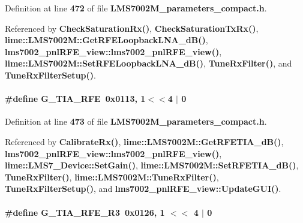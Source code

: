 Definition at line {\bf 472} of file {\bf L\+M\+S7002\+M\+\_\+parameters\+\_\+compact.\+h}.



Referenced by {\bf Check\+Saturation\+Rx()}, {\bf Check\+Saturation\+Tx\+Rx()}, {\bf lime\+::\+L\+M\+S7002\+M\+::\+Get\+R\+F\+E\+Loopback\+L\+N\+A\+\_\+d\+B()}, {\bf lms7002\+\_\+pnl\+R\+F\+E\+\_\+view\+::lms7002\+\_\+pnl\+R\+F\+E\+\_\+view()}, {\bf lime\+::\+L\+M\+S7002\+M\+::\+Set\+R\+F\+E\+Loopback\+L\+N\+A\+\_\+d\+B()}, {\bf Tune\+Rx\+Filter()}, and {\bf Tune\+Rx\+Filter\+Setup()}.

\paragraph[{G\+\_\+\+T\+I\+A\+\_\+\+R\+FE}]{\setlength{\rightskip}{0pt plus 5cm}\#define G\+\_\+\+T\+I\+A\+\_\+\+R\+FE~0x0113, 1$<$$<$4 $\vert$  0}\label{LMS7002M__parameters__compact_8h_ab4d0f8950359fa83b6c96a4013484410}


Definition at line {\bf 473} of file {\bf L\+M\+S7002\+M\+\_\+parameters\+\_\+compact.\+h}.



Referenced by {\bf Calibrate\+Rx()}, {\bf lime\+::\+L\+M\+S7002\+M\+::\+Get\+R\+F\+E\+T\+I\+A\+\_\+d\+B()}, {\bf lms7002\+\_\+pnl\+R\+F\+E\+\_\+view\+::lms7002\+\_\+pnl\+R\+F\+E\+\_\+view()}, {\bf lime\+::\+L\+M\+S7\+\_\+\+Device\+::\+Set\+Gain()}, {\bf lime\+::\+L\+M\+S7002\+M\+::\+Set\+R\+F\+E\+T\+I\+A\+\_\+d\+B()}, {\bf Tune\+Rx\+Filter()}, {\bf lime\+::\+L\+M\+S7002\+M\+::\+Tune\+Rx\+Filter()}, {\bf Tune\+Rx\+Filter\+Setup()}, and {\bf lms7002\+\_\+pnl\+R\+F\+E\+\_\+view\+::\+Update\+G\+U\+I()}.

\paragraph[{G\+\_\+\+T\+I\+A\+\_\+\+R\+F\+E\+\_\+\+R3}]{\setlength{\rightskip}{0pt plus 5cm}\#define G\+\_\+\+T\+I\+A\+\_\+\+R\+F\+E\+\_\+\+R3~0x0126, 1 $<$$<$ 4 $\vert$ 0}\label{LMS7002M__parameters__compact_8h_ac038a2eaf424704cce9c4eb7d6b20073}


